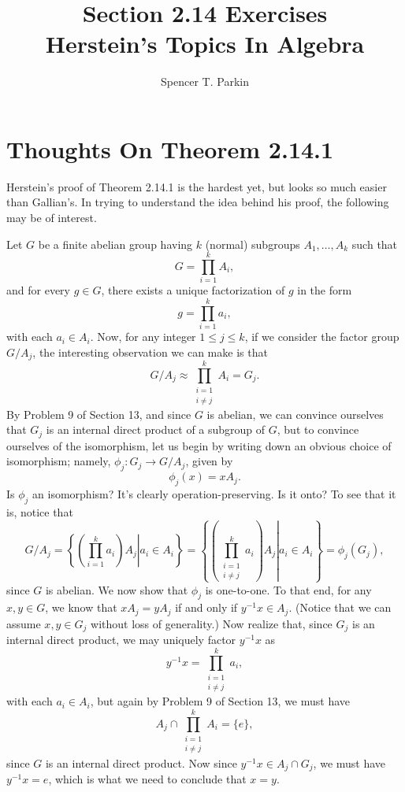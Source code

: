 \documentclass[12pt]{article}
\title{Section 2.14 Exercises\\Herstein's Topics In Algebra}
\author{Spencer T. Parkin}
\begin{document}
\maketitle

\section*{Thoughts On Theorem 2.14.1}

Herstein's proof of Theorem 2.14.1 is the hardest yet, but looks so much easier than Gallian's.
In trying to understand the idea behind his proof, the following may be of interest.

Let $G$ be a finite abelian group having $k$ (normal) subgroups $A_1,\dots,A_k$ such that
\begin{equation*}
G=\prod_{i=1}^k A_i,
\end{equation*}
and for every $g\in G$, there exists a unique factorization of $g$ in the form
\begin{equation*}
g=\prod_{i=1}^k a_i,
\end{equation*}
with each $a_i\in A_i$.  Now, for any integer $1\leq j\leq k$, if we consider the factor group
$G/A_j$, the interesting observation we can make is that
\begin{equation*}
G/A_j\approx\prod_{\substack{i=1\\i\neq j}}^k A_i=G_j.
\end{equation*}
By Problem 9 of Section 13, and since $G$ is abelian, we can convince ourselves that $G_j$ is an internal direct product of a subgroup of $G$,
but to convince ourselves of the isomorphism, let us begin by writing down an obvious choice of isomorphism; namely,
$\phi_j:G_j\to G/A_j$, given by
\begin{equation*}
\phi_j(x)=xA_j.
\end{equation*}
Is $\phi_j$ an isomorphism?  It's clearly operation-preserving.  Is it onto?  To see that it is, notice that
\begin{equation*}
G/A_j=\left\{\left.\left(\prod_{i=1}^k a_i\right)A_j\right|a_i\in A_i\right\}=\left\{\left.\left(\prod_{\substack{i=1\\i\neq j}}^k a_i\right)A_j\right|a_i\in A_i\right\}=\phi_j(G_j),
\end{equation*}
since $G$ is abelian.  We now show that $\phi_j$ is one-to-one.  To that end, for any $x,y\in G$, we know that $xA_j=yA_j$ if and only if
$y^{-1}x\in A_j$.  (Notice that we can assume $x,y\in G_j$ without loss of generality.)
Now realize that, since $G_j$ is an internal direct product, we may uniquely factor $y^{-1}x$ as
\begin{equation*}
y^{-1}x = \prod_{\substack{i=1\\i\neq j}}^k a_i,
\end{equation*}
with each $a_i\in A_i$, but again by Problem 9 of Section 13, we must have
\begin{equation*}
A_j\cap\prod_{\substack{i=1\\i\neq j}}^k A_i=\{e\},
\end{equation*}
since $G$ is an internal direct product.  Now since $y^{-1}x\in A_j\cap G_j$,
we must have $y^{-1}x=e$, which is what we need to conclude that $x=y$.
\end{document}
